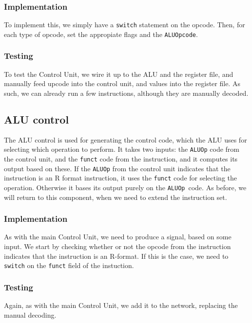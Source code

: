 \subsubsection*{Implementation}
To implement this, we simply have a \texttt{switch} statement on the opcode.
Then, for each type of opcode, set the appropiate flags and the
\texttt{ALUOpcode}.

\subsubsection*{Testing}
To test the Control Unit, we wire it up to the ALU and the register file, and
manually feed upcode into the control unit, and values into the register file.
As such, we can already run a few instructions, although they are manually
decoded.

\subsection{ALU control}\label{sec:alu-control}
The ALU control is used for generating the control code, which the ALU uses for
selecting which operation to perform. It takes two inputs: the \texttt{ALUOp}
code from the control unit, and the \texttt{funct} code from the instruction,
and it computes its output based on these. If the \texttt{ALUOp} from the
control unit indicates that the instruction is an R format instruction, it uses
the \texttt{funct} code for selecting the operation. Otherwise it bases its
output purely on the \texttt{ALUOp} code. As before, we will return to this
component, when we need to extend the instruction set.

\subsubsection*{Implementation}
As with the main Control Unit, we need to produce a signal, based on some
input. We start by checking whether or not the opcode from the instruction
indicates that the instruction is an R-format. If this is the case, we need to
\texttt{switch} on the \texttt{funct} field of the instuction.

\subsubsection*{Testing}
Again, as with the main Control Unit, we add it to the network, replacing the
manual decoding.

